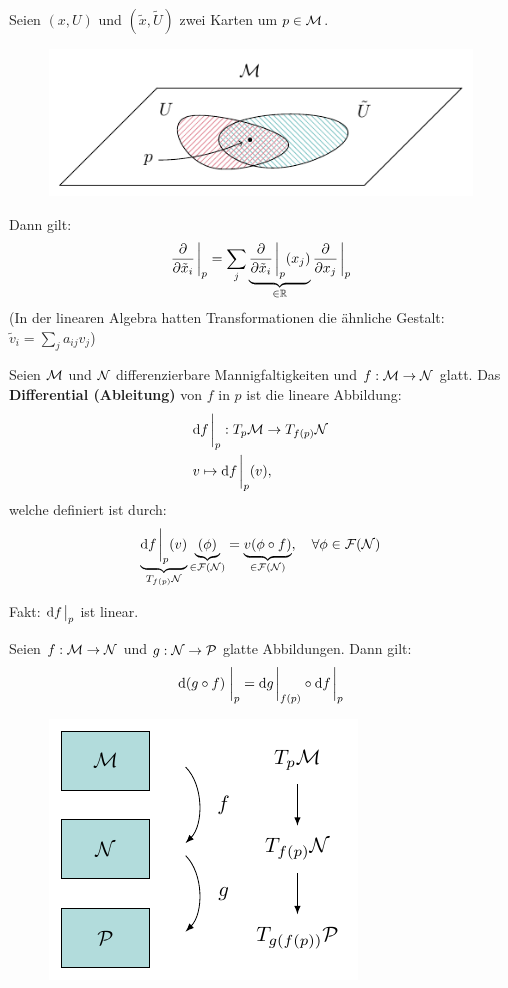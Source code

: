 \begin{satz}[Transformationsregel]
Seien $(x, U)$ und $(\tilde{x}, \tilde{U})$ zwei Karten um $p \in \mathcal{M}$.
\begin{figure}[H]
\centering
\includegraphics[scale=1.0]{figures/tikz/transformationlaw.pdf}
\label{img:transformationsregel}
\end{figure}  
Dann gilt:
\begin{align}
\pdv{\tilde{x}_i} \eval_p  = \sum_j \underbrace{\pdv{\tilde{x}_i} \eval_p  (x_j)}_{\in \R} \pdv{x_j} \eval_p 
\end{align}
(In der linearen Algebra hatten Transformationen die ähnliche Gestalt: $\tilde{v}_i = \sum_j a_{i j } v_j$)
\end{satz}
\begin{defs}
Seien $\mathcal{M}$ und $\mathcal{N}$ differenzierbare Mannigfaltigkeiten und $f: \mathcal{M} \to \mathcal{N}$ glatt.
Das \textbf{Differential (Ableitung)} von $f$ in $p$ ist die lineare Abbildung:
\begin{align*}
& \dd f \eval_p : \tspace{p} \to T_{f(p)}\mfka \\
& v \mapsto \dd f \eval_p (v),
\end{align*}
welche definiert ist durch:
\begin{align*}
\underbrace{\dd f \eval_p (v)}_{T_{f(p)}\mfka} \underbrace{(\phi)}_{\in \mathcal{F}(\mfka)} = \underbrace{v(\phi \circ f)}_{\in \mathcal{F}(\mfka)}, \quad \forall \phi \in \mathcal{F}(\mfka)
\end{align*}
\end{defs}
Fakt: $\dd f \eval_p$ ist linear.
\begin{satz}[Kettenregel]
\label{satz:Kettenregel}
Seien $f: \mathcal{M} \to \mathcal{N}$ und $g: \mathcal{N} \to \mathcal{P}$ glatte Abbildungen.
Dann gilt:
\begin{align}
\dd (g \circ f) \eval_p = \dd g \eval_{f(p)} \circ \dd f \eval_p
\end{align}
\begin{figure}[H]
\centering
\includegraphics[width=0.45\linewidth]{figures/tikz/chain_rule.pdf}
\label{img:kettenregel}
\end{figure} 
\end{satz}

